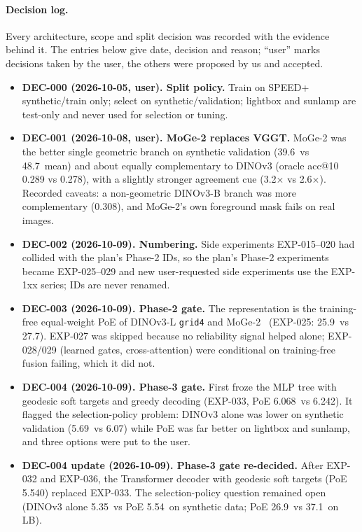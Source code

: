 \paragraph{Decision log.}
Every architecture, scope and split decision was recorded with the evidence behind it. The entries below give date, decision and reason; ``user'' marks decisions taken by the user, the others were proposed by us and accepted.
\begin{itemize}
\item \textbf{DEC-000 (2026-10-05, user). Split policy.} Train on SPEED+ synthetic/train only; select on synthetic/validation; lightbox and sunlamp are test-only and never used for selection or tuning.
\item \textbf{DEC-001 (2026-10-08, user). MoGe-2 replaces VGGT.} MoGe-2 was the better single geometric branch on synthetic validation (39.6\appDdeg\ vs 48.7\appDdeg\ mean) and about equally complementary to DINOv3 (oracle acc@10 0.289 vs 0.278), with a slightly stronger agreement cue (3.2$\times$ vs 2.6$\times$). Recorded caveats: a non-geometric DINOv3-B branch was more complementary (0.308), and MoGe-2's own foreground mask fails on real images.
\item \textbf{DEC-002 (2026-10-09). Numbering.} Side experiments EXP-015--020 had collided with the plan's Phase-2 IDs, so the plan's Phase-2 experiments became EXP-025--029 and new user-requested side experiments use the EXP-1xx series; IDs are never renamed.
\item \textbf{DEC-003 (2026-10-09). Phase-2 gate.} The representation is the training-free equal-weight PoE of DINOv3-L \texttt{grid4} and MoGe-2 \appDnormals\ (EXP-025: 25.9\appDdeg\ vs 27.7\appDdeg). EXP-027 was skipped because no reliability signal helped alone; EXP-028/029 (learned gates, cross-attention) were conditional on training-free fusion failing, which it did not.
\item \textbf{DEC-004 (2026-10-09). Phase-3 gate.} First froze the MLP tree with geodesic soft targets and greedy decoding (EXP-033, PoE 6.068\appDdeg\ vs 6.242\appDdeg). It flagged the selection-policy problem: DINOv3 alone was lower on synthetic validation (5.69\appDdeg\ vs 6.07\appDdeg) while PoE was far better on lightbox and sunlamp, and three options were put to the user.
\item \textbf{DEC-004 update (2026-10-09). Phase-3 gate re-decided.} After EXP-032 and EXP-036, the Transformer decoder with geodesic soft targets (PoE 5.540\appDdeg) replaced EXP-033. The selection-policy question remained open (DINOv3 alone 5.35\appDdeg\ vs PoE 5.54\appDdeg\ on synthetic data; PoE 26.9\appDdeg\ vs 37.1\appDdeg\ on LB).

\end{itemize}
